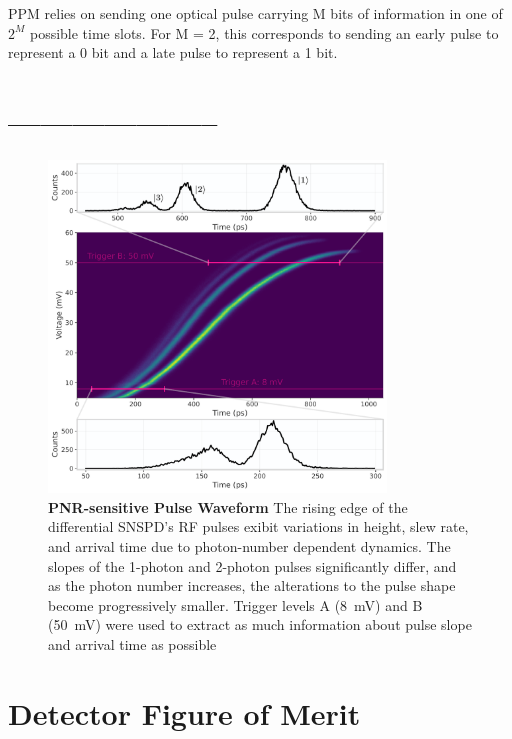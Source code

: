 \documentclass{optica-article}
\begin{document}
PPM relies on sending one optical pulse carrying M bits of information in one of \(2^M\) possible time slots. For M = 2, this corresponds to sending an early pulse to represent a 0 bit and a late pulse to represent a 1 bit.

\hypertarget{section}{%
\section{--------------------}\label{section}}

\hypertarget{fig:waveform}{%
\begin{figure}
\centering
\includegraphics[width=0.8\textwidth]{./figs_03/waveform_light.pdf}
\caption[{PNR-sensitive Pulse Waveform}]{\textbf{PNR-sensitive Pulse Waveform} The rising edge of the differential SNSPD's RF pulses exibit variations in height, slew rate, and arrival time due to photon-number dependent dynamics. The slopes of the 1-photon and 2-photon pulses significantly differ, and as the photon number increases, the alterations to the pulse shape become progressively smaller. Trigger levels A (8~mV) and B (50~mV) were used to extract as much information about pulse slope and arrival time as possible}
\label{fig:waveform}
\end{figure}
}

\hypertarget{detector-figure-of-merit}{%
\section{Detector Figure of Merit}\label{detector-figure-of-merit}}
\end{document}
